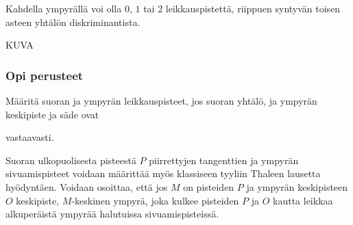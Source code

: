 Kahdella ympyrällä voi olla $0$, $1$ tai $2$ leikkauspistettä, riippuen syntyvän toisen asteen yhtälön diskriminantista.

KUVA

\begin{tehtavasivu}

\subsubsection*{Opi perusteet}
\begin{tehtava}
Määritä suoran ja ympyrän leikkauspisteet, jos suoran yhtälö, ja ympyrän keskipiste ja säde ovat
\begin{alakohdat}
\end{alakohdat}
vastaavasti.
\begin{vastaus}
\begin{alakohdat}
\end{alakohdat}
\end{vastaus}
\end{tehtava}

\begin{tehtava}
Suoran ulkopuolisesta pisteestä $P$ piirrettyjen tangenttien ja ympyrän sivuamispisteet voidaan määrittää myös klassiseen tyyliin Thaleen lausetta hyödyntäen. Voidaan osoittaa, että jos $M$ on pisteiden $P$ ja ympyrän keskipisteen $O$ keskipiste, $M$-keskinen ympyrä, joka kulkee pisteiden $P$ ja $O$ kautta leikkaa alkuperäistä ympyrää halutuissa sivuamispisteissä.

\begin{alakohdat}
\end{alakohdat}
\begin{vastaus}
\begin{alakohdat}
\end{alakohdat}
\end{vastaus}
\end{tehtava}


\end{tehtavasivu}
